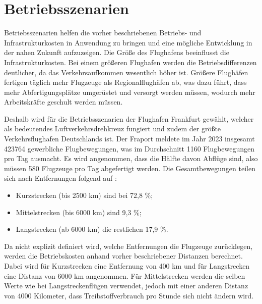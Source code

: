 
\section{Betriebsszenarien}
\label{s:Betriebsszenarien}
Betriebsszenarien helfen die vorher beschriebenen Betriebs- und Infrastrukturkosten in Anwendung zu bringen 
und eine mögliche Entwicklung in der nahen Zukunft aufzuzeigen. 
Die Größe des Flughafens beeinflusst die Infrastrukturkosten. 
Bei einem größeren Flughafen werden die Betriebsdifferenzen deutlicher, da das Verkehrsaufkommen wesentlich höher ist.
Größere Flughäfen fertigen täglich mehr Flugzeuge als Regionalflughäfen ab, 
was dazu führt, dass mehr Abfertigungsplätze umgerüstet und versorgt werden müssen, wodurch mehr Arbeitskräfte geschult werden müssen.

Deshalb wird für die Betriebsszenarien der Flughafen Frankfurt gewählt, welcher als bedeutendes Luftverkehrsdrehkreuz fungiert
und zudem der größte Verkehrsflughafen Deutschlands ist.
Der Fraport meldete im Jahr 2023 insgesamt 423764 gewerbliche Flugbewegungen, was im Durchschnitt 1160 Flugbewegungen pro Tag ausmacht. 
Es wird angenommen, dass die Hälfte davon Abflüge sind, also müssen 580 Flugzeuge pro Tag abgefertigt werden.
%
Die Gesamtbewegungen teilen sich nach Entfernungen folgend auf \cite{fraport2023frankfurt}:
\begin{itemize}
    \item Kurzstrecken (bis 2500 km) sind bei 72,8 \%;
    \item Mittelstrecken (bis 6000 km) sind 9,3 \%;
    \item Langstrecken (ab 6000 km) die restlichen 17,9 \%. 
    \end{itemize}
Da nicht explizit definiert wird, welche Entfernungen die Flugzeuge zurücklegen, werden die Betriebskosten anhand vorher beschriebener Distanzen berechnet.
Dabei wird für Kurzstrecken eine Entfernung von 400 km und für Langstrecken eine Distanz von 6000 km angenommen.
Für Mittelstrecken werden die selben Werte wie bei Langstreckenflügen verwendet, jedoch mit einer anderen Distanz von 4000 Kilometer,
dass Treibstoffverbrauch pro Stunde sich nicht ändern wird.


